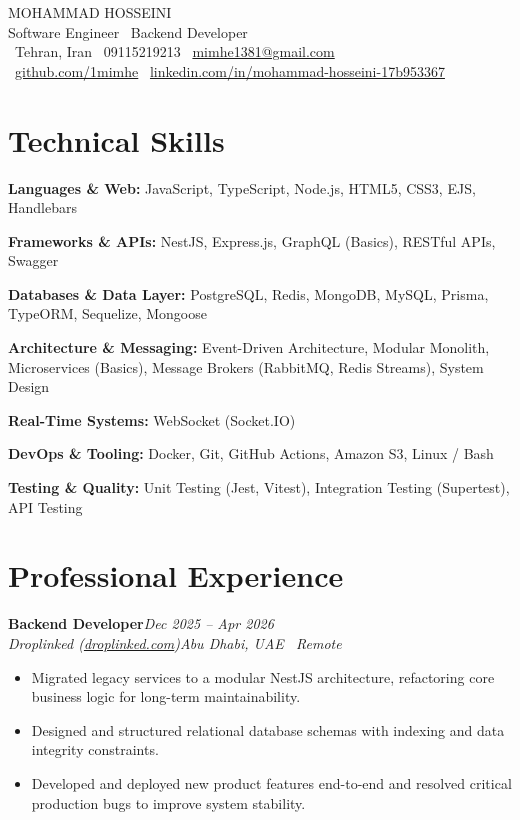 \documentclass[a4paper,10pt]{article}
\newcommand{\namefont}{}
\newcommand{\experienceheader}[4]{%
  \noindent\textbf{#1}\hfill\textit{\small\color{medgray}#3}\\[-2pt]
  \textit{\color{medgray}#2}\hfill\textit{\small\color{medgray}#4}
  \vspace{2pt}
}
\newcommand{\skillcategory}[2]{%
  \noindent\textbf{#1:} #2\par\vspace{2.5pt}%
}
\begin{document}
\begin{center}
  {\fontsize{21pt}{25pt}\selectfont\namefont\color{primary} MOHAMMAD HOSSEINI}\\[5pt]
  {\large\color{accent} Software Engineer \textbar\ Backend Developer}\\[8pt]
  {\small
    \faMapMarker*\ Tehran, Iran \quad\textbar\quad
    \faPhone\ 09115219213 \quad\textbar\quad
    \faEnvelope\ \href{mailto:mimhe1381@gmail.com}{mimhe1381@gmail.com}\\[3pt]
    \faGithub\ \href{https://github.com/1mimhe}{github.com/1mimhe} \quad\textbar\quad
    \faLinkedin\ \href{http://www.linkedin.com/in/mohammad-hosseini-17b953367/}{linkedin.com/in/mohammad-hosseini-17b953367}
  }
\end{center}

\vspace{-4pt}

\section{Technical Skills}
\skillcategory{Languages \& Web}{JavaScript, TypeScript, Node.js, HTML5, CSS3, EJS, Handlebars}
\skillcategory{Frameworks \& APIs}{NestJS, Express.js, GraphQL (Basics), RESTful APIs, Swagger}
\skillcategory{Databases \& Data Layer}{PostgreSQL, Redis, MongoDB, MySQL, Prisma, TypeORM, Sequelize, Mongoose}
\skillcategory{Architecture \& Messaging}{Event-Driven Architecture, Modular Monolith, Microservices (Basics), Message Brokers (RabbitMQ, Redis Streams), System Design}
\skillcategory{Real-Time Systems}{WebSocket (Socket.IO)}
\skillcategory{DevOps \& Tooling}{Docker, Git, GitHub Actions, Amazon S3, Linux / Bash}
\skillcategory{Testing \& Quality}{Unit Testing (Jest, Vitest), Integration Testing (Supertest), API Testing}

\section{Professional Experience}

\experienceheader
  {Backend Developer}
  {Droplinked (\href{https://droplinked.com/}{droplinked.com})}
  {Dec 2025 -- Apr 2026}
  {Abu Dhabi, UAE \textbar\ Remote}

\begin{itemize}
  \item Migrated legacy services to a modular NestJS architecture, refactoring core business logic for long-term maintainability.
  \item Designed and structured relational database schemas with indexing and data integrity constraints.
  \item Developed and deployed new product features end-to-end and resolved critical production bugs to improve system stability.
\end{itemize}
\end{document}
